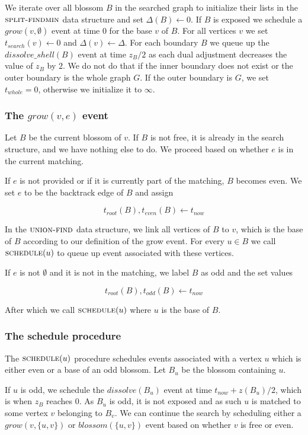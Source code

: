 We iterate over all blossom $B$ in the searched graph to initialize their lists in the $\textsc{split-findmin}$ data structure and set $\Delta(B) \gets 0$. If $B$ is exposed we schedule a $grow(v, \emptyset)$ event at time $0$ for the base $v$ of $B$. For all vertices $v$ we set $t_{search}(v) \gets 0$ and $\Delta(v) \gets \Delta$. For each boundary $B$ we queue up the $dissolve\_shell(B)$ event at time $z_B / 2$ as each dual adjustment decreases the value of $z_B$ by $2$. We do not do that if the inner boundary does not exist or the outer boundary is the whole graph $G$. If the outer boundary is $G$, we set $t_{whole} = 0$, otherwise we initialize it to $\infty$.

\subsubsection*{The $grow(v, e)$ event}
Let $B$ be the current blossom of $v$. If $B$ is not free, it is already in the search structure, and we have nothing else to do. We proceed based on whether $e$ is in the current matching.

If $e$ is not provided or if it is currently part of the matching, $B$ becomes even. We set $e$ to be the backtrack edge of $B$ and assign

\[ t_{root}(B), t_{even}(B) \gets t_{now} \]

In the $\textsc{union-find}$ data structure, we link all vertices of $B$ to $v$, which is the base of $B$ according to our definition of the grow event. For every $u \in B$ we call $\textsc{schedule}(u)$ to queue up event associated with these vertices.

If $e$ is not $\emptyset$ and it is not in the matching, we label $B$ as odd and the set values

\[ t_{root}(B), t_{odd}(B) \gets t_{now} \]

After which we call $\textsc{schedule}(u)$ where $u$ is the base of $B$.

\subsubsection*{The schedule procedure}
The $\textsc{schedule}(u)$ procedure schedules events associated with a vertex $u$ which is either even or a base of an odd blossom. Let $B_u$ be the blossom containing $u$. 

If $u$ is odd, we schedule the $dissolve(B_u)$ event at time $t_{now} + z(B_u) / 2$, which is when $z_B$ reaches $0$. As $B_u$ is odd, it is not exposed and as such $u$ is matched to some vertex $v$ belonging to $B_v$. We can continue the search by scheduling either a $grow(v, \{u, v\})$ or $blossom(\{u, v\})$ event based on whether $v$ is free or even.

